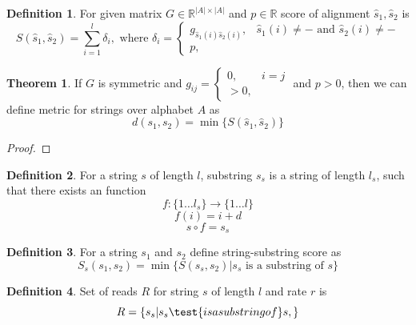 \documentclass[a4paper, 12pt]{article}
\theoremstyle{definition}
\newtheorem{definition}{Definition}[section]
\theoremstyle{definition}
\newtheorem{theorem}{Theorem}
\theoremstyle{remark}
\begin{document}
\begin{definition}
    For given matrix $G \in \mathbb{R}^{|A| \times |A|}$ and $p \in \mathbb{R}$ 
    score of alignment $\hat{s}_1, \hat{s}_2$ is 
    $$ S(\hat{s}_1, \hat{s}_2) = \sum_{i = 1}^l \delta_i, 
        \text{ where } 
        \delta_{i}=
            \left\{\begin{array}{cc}
            g_{\hat{s}_1(i) \hat{s}_2(i)},& \hat{s}_1(i) \neq - \text{ and } \hat{s}_2(i) \neq -\\
            p, & 
            \end{array}\right. 
    $$
\end{definition}


\begin{theorem}
    If $G$ is symmetric and 
    $
    g_{ij} =
        \left\{\begin{array}{cc}
        0, & i = j\\
        >0, & 
        \end{array}\right.
    $ and $p > 0$, then we can define metric for strings over alphabet $A$ as 
    $$ d(s_1, s_2) = \min \{S(\hat{s}_1, \hat{s}_2)\}$$ 
\end{theorem}

\begin{proof}
    
\end{proof}

\begin{definition}
    For a string $s$ of length $l$, substring $s_s$ 
    is a string of length $l_s$, such that there exists an function
    $$f: \{ 1 \ldots l_s \} \rightarrow \{ 1 \ldots l\}$$
    $$f(i) = i + d $$
    $$s \circ f = s_s $$
\end{definition}

\begin{definition}
    For a string $s_1$ and $s_2$ define string-substring score as 
    $$ S_s (s_1, s_2) = \min \{ S(s_s, s_2) | s_s \text{ is a substring of } s \}$$
\end{definition}

\begin{definition}
    Set of reads $R$ for string $s$ of length $l$ and rate $r$ is 
    $$ R = \{ s_s | s_s \test{is a substring of } s,   \}$$
\end{definition}
\end{document}
